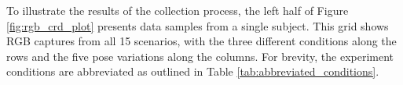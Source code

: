 \documentclass{mpaper}
\begin{document}
To illustrate the results of the collection process, the left half of Figure \ref{fig:rgb_crd_plot} presents data samples from a single subject. This grid shows RGB captures from all 15 scenarios, with the three different conditions along the rows and the five pose variations along the columns. For brevity, the experiment conditions are abbreviated as outlined in Table \ref{tab:abbreviated_conditions}.

\begin{table}[h!]
    \centering
    \vspace{0.1cm}
    \caption{Table displaying full forms for abbreviations describing experiment conditions.}
    \label{tab:abbreviated_conditions}
    \vspace{-0.55cm}
\end{table}
\end{document}
